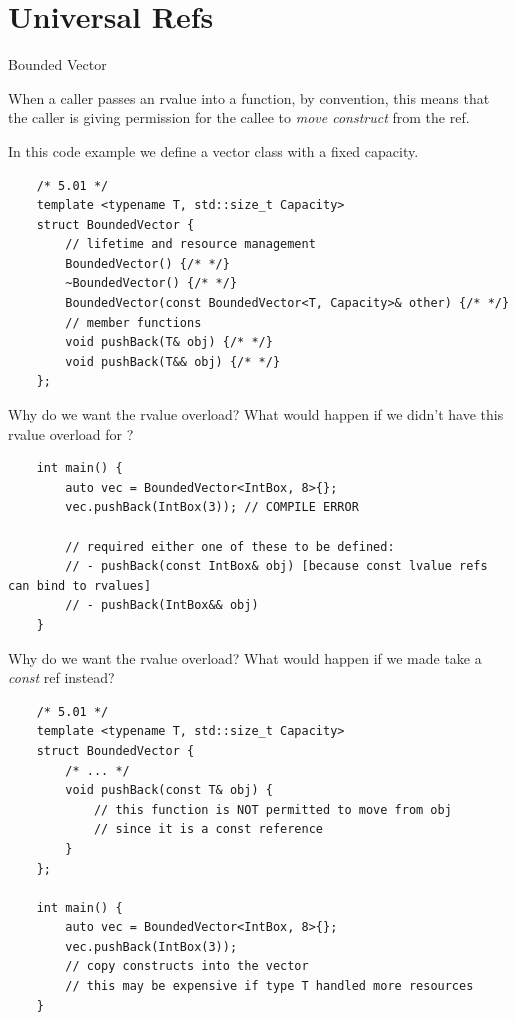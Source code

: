 \section{Universal Refs}

\begin{frame}[fragile]{Bounded Vector}
  \begin{sqt:result}
    When a caller passes an rvalue into a function,
    by convention, this means that the caller is giving permission 
    for the callee to \emph{move construct} from the ref.
  \end{sqt:result}
  In this code example we define a vector class with a fixed capacity.
  \begin{verbatim}
    /* 5.01 */
    template <typename T, std::size_t Capacity>
    struct BoundedVector {
        // lifetime and resource management
        BoundedVector() {/* */}
        ~BoundedVector() {/* */}
        BoundedVector(const BoundedVector<T, Capacity>& other) {/* */}
        // member functions
        void pushBack(T& obj) {/* */}
        void pushBack(T&& obj) {/* */}
    };
  \end{verbatim}
\end{frame}

\begin{frame}[fragile]{Why do we want the rvalue overload?}
  What would happen if we didn't have this rvalue overload for ?

  \begin{verbatim}
    int main() {
        auto vec = BoundedVector<IntBox, 8>{};
        vec.pushBack(IntBox(3)); // COMPILE ERROR

        // required either one of these to be defined:
        // - pushBack(const IntBox& obj) [because const lvalue refs can bind to rvalues]
        // - pushBack(IntBox&& obj)
    }
  \end{verbatim}
\end{frame}

\begin{frame}[fragile]{Why do we want the rvalue overload?}
  What would happen if we made  take a \emph{const} ref instead?
  \begin{verbatim}
    /* 5.01 */
    template <typename T, std::size_t Capacity>
    struct BoundedVector {
        /* ... */
        void pushBack(const T& obj) {
            // this function is NOT permitted to move from obj
            // since it is a const reference
        }
    };

    int main() {
        auto vec = BoundedVector<IntBox, 8>{};
        vec.pushBack(IntBox(3));
        // copy constructs into the vector
        // this may be expensive if type T handled more resources
    }
  \end{verbatim}
\end{frame}

